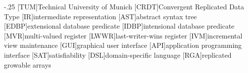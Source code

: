 \documentclass[headsepline,footsepline,footinclude=false,oneside,fontsize=11pt,paper=a4,listof=totoc,bibliography=totoc]{scrbook} %
\begin{document}


\frontmatter{}





\tableofcontents{}

\mainmatter{}







\appendix{}


\begin{acronym}
    \itemsep-.25\baselineskip
    [TUM]{Technical University of Munich}
    [CRDT]{Convergent Replicated Data Type}
    [IR]{intermediate representation}
    [AST]{abstract syntax tree}
    [EDBP]{extensional database predicate}
    [IDBP]{intensional database predicate}
    [MVR]{multi-valued register}
    [LWWR]{last-writer-wins register}
    [IVM]{incremental view maintenance}
    [GUI]{graphical user interface}
    [API]{application programming interface}
    [SAT]{satisfiability}
    [DSL]{domain-specific language}
    [RGA]{replicated growable arrays}
\end{acronym}

\listoffigures{}
\printbibliography{}
\end{document}

